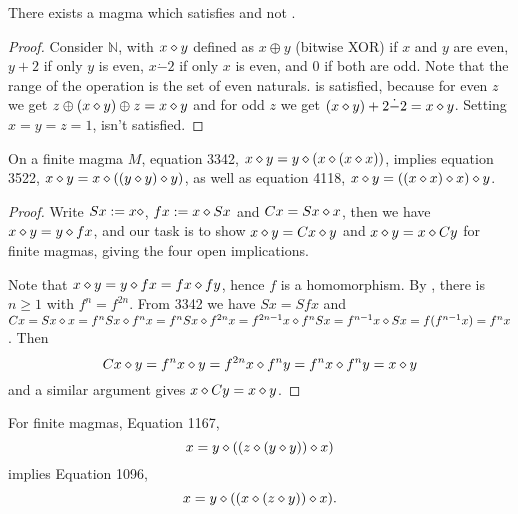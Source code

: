 \begin{proposition}\label{non_imp_3994_3588_thm}
  \leanok
  There exists a magma which satisfies  and not .
\end{proposition}

\begin{proof} \leanok
  Consider $\mathbb{N}$, with $x \diamond y$ defined as $x \oplus y$ (bitwise XOR) if $x$ and $y$ are even,
  $y+2$ if only $y$ is even, $x \dot - 2$ if only $x$ is even, and $0$ if both are odd.
  Note that the range of the operation is the set of even naturals.
   is satisfied, because for even $z$ we get $z \oplus (x \diamond y) \oplus z = x \diamond y$
  and for odd $z$ we get $(x \diamond y) + 2 \dot - 2 = x \diamond y$.
  Setting $x = y = z = 1$,  isn't satisfied.
\end{proof}

\begin{proposition}[3342]\label{3342}  \leanok  On a finite magma $M$, equation 3342, $x \diamond y= y \diamond (x \diamond (x \diamond x))$, implies
  equation 3522, $x \diamond y = x \diamond ((y \diamond y) \diamond y)$, as well as equation 4118, $x \diamond y = ((x \diamond x) \diamond x) \diamond y$.
\end{proposition}

\begin{proof} \leanok Write $Sx := x \diamond$, $fx := x \diamond Sx$ and $Cx = Sx \diamond x$, then we have $x \diamond y= y \diamond fx$, and our task is to show $x \diamond y = Cx \diamond y$ and $x \diamond y = x \diamond Cy$ for finite magmas, giving the four open implications.

Note that $x \diamond y= y \diamond fx = fx \diamond fy$, hence $f$ is a homomorphism.  By , there is $n \geq 1$ with $f^n = f^{2n}$.  From 3342 we have $Sx = S fx$ and $Cx = Sx \diamond x = f^n Sx \diamond f^n x = f^n Sx \diamond f^{2n} x = f^{2n-1} x \diamond f^n Sx = f^{n-1} x \diamond S x = f(f^{n-1} x) = f^n x$.  Then
$$ Cx \diamond y = f^n x \diamond y = f^{2n} x \diamond f^n y = f^n x \diamond f^n y = x \diamond y$$
and a similar argument gives $x \diamond Cy = x \diamond y$.
\end{proof}

\begin{proposition}[1167 implies 1096]\label{1167-1096}\leanok{}
  For finite magmas, Equation 1167,
  $$ x = y \diamond ((z \diamond (y \diamond y)) \diamond x)$$
implies Equation 1096,
$$ x = y \diamond ((x \diamond (z \diamond y)) \diamond x).$$
\end{proposition}

